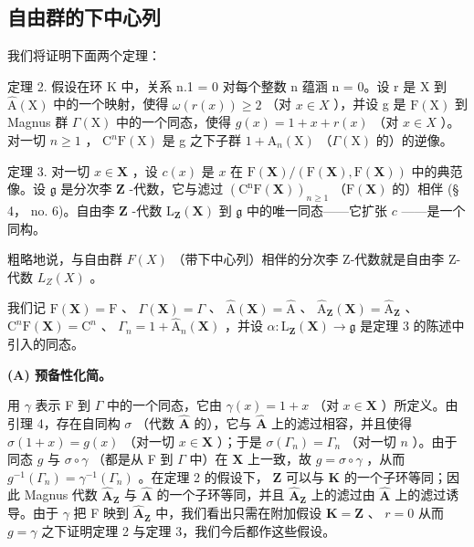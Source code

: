 \subsection{自由群的下中心列}

我们将证明下面两个定理：

定理 2. 假设在环 K 中，关系 n.1 = 0 对每个整数 n 蕴涵 n = 0。设 r 是 X 到 \(\hat{\mathrm{A}}(\mathrm{X})\) 中的一个映射，使得 \(\omega(r(x)) \geqslant 2\) （对 \(x \in X\) ），并设 g 是 \(\mathrm{F}(\mathrm{X})\) 到 Magnus 群 \(\Gamma(\mathrm{X})\) 中的一个同态，使得 \(g(x) = 1 + x + r(x)\) （对 \(x \in X\) ）。对一切 \(n \geqslant 1\) ， \(\mathrm{C}^n\mathrm{F}(\mathrm{X})\) 是 g 之下子群 \(1 + \hat{\mathrm{A}}_n(\mathrm{X})\) （\(\Gamma(\mathrm{X})\) 的）的逆像。

定理 3. 对一切 \(x \in \mathbf{X}\) ，设 \(c(x)\) 是 \(x\) 在 \(\mathrm{F}(\mathbf{X}) / (\mathrm{F}(\mathbf{X}), \mathrm{F}(\mathbf{X}))\) 中的典范像。设 \(\mathfrak{g}\) 是分次李 \(\mathbf{Z}\) -代数，它与滤过 \((\mathrm{C}^{\mathrm{n}}\mathrm{F}(\mathbf{X}))_{n \geqslant 1}\) （\(\mathrm{F}(\mathbf{X})\) 的）相伴 (§ 4， no. 6)。自由李 \(\mathbf{Z}\) -代数 \(\mathrm{L}_{\mathbf{Z}}(\mathbf{X})\) 到 \(\mathfrak{g}\) 中的唯一同态——它扩张 \(c\) ——是一个同构。

粗略地说，与自由群 \(F(X)\) （带下中心列）相伴的分次李 Z-代数就是自由李 Z-代数 \(L_{Z}(X)\) 。

我们记 \(\mathrm{F}(\mathbf{X}) = \mathrm{F}\) 、 \(\Gamma(\mathbf{X}) = \Gamma\) 、 \(\hat{\mathrm{A}}(\mathbf{X}) = \hat{\mathrm{A}}\) 、 \(\hat{\mathrm{A}}_{\mathbf{Z}}(\mathbf{X}) = \hat{\mathrm{A}}_{\mathbf{Z}}\) 、 \(\mathrm{C}^n\mathrm{F}(\mathbf{X}) = \mathrm{C}^n\) 、 \(\Gamma_n = 1 + \hat{\mathrm{A}}_n(\mathbf{X})\) ，并设 \(\alpha: \mathrm{L}_{\mathbf{Z}}(\mathbf{X}) \to \mathfrak{g}\) 是定理 3 的陈述中引入的同态。

\textbf{(A) 预备性化简。}

用 \(\gamma\) 表示 F 到 \(\Gamma\) 中的一个同态，它由 \(\gamma(x) = 1 + x\) （对 \(x \in \mathbf{X}\) ）所定义。由引理 4，存在自同构 \(\sigma\) （代数 \(\hat{\mathbf{A}}\) 的），它与 \(\hat{\mathbf{A}}\) 上的滤过相容，并且使得 \(\sigma(1 + x) = g(x)\) （对一切 \(x \in \mathbf{X}\) ）；于是 \(\sigma(\Gamma_n) = \Gamma_n\) （对一切 \(n\) ）。由于同态 \(g\) 与 \(\sigma \circ \gamma\) （都是从 F 到 \(\Gamma\) 中）在 \(\mathbf{X}\) 上一致，故 \(g = \sigma \circ \gamma\) ，从而 \(g^{-1}(\Gamma_n) = \gamma^{-1}(\Gamma_n)\) 。在定理 2 的假设下， \(\mathbf{Z}\) 可以与 \(\mathbf{K}\) 的一个子环等同；因此 Magnus 代数 \(\hat{\mathbf{A}}_{\mathbf{Z}}\) 与 \(\hat{\mathbf{A}}\) 的一个子环等同，并且 \(\hat{\mathbf{A}}_{\mathbf{Z}}\) 上的滤过由 \(\hat{\mathbf{A}}\) 上的滤过诱导。由于 \(\gamma\) 把 F 映到 \(\hat{\mathbf{A}}_{\mathbf{Z}}\) 中，我们看出只需在附加假设 \(\mathbf{K} = \mathbf{Z}\) 、 \(r = 0\) 从而 \(g = \gamma\) 之下证明定理 2 与定理 3，我们今后都作这些假设。

